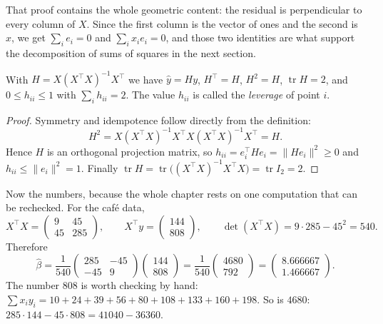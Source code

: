 That proof contains the whole geometric content: the residual is perpendicular to every column
of $X$. Since the first column is the vector of ones and the second is $x$, we get
$\sum_i e_i=0$ and $\sum_i x_ie_i=0$, and those two identities are what support the
decomposition of sums of squares in the next section.

\begin{proposisi}
With $H=X(X^{\top}X)^{-1}X^{\top}$ we have $\hat y=Hy$, $H^{\top}=H$, $H^2=H$,
$\operatorname{tr}H=2$, and $0\le h_{ii}\le1$ with $\sum_i h_{ii}=2$. The value $h_{ii}$ is
called the \emph{leverage} of point $i$.
\end{proposisi}

\begin{proof}[Proof]
Symmetry and idempotence follow directly from the definition:
\[
H^2=X(X^{\top}X)^{-1}X^{\top}X(X^{\top}X)^{-1}X^{\top}=H .
\]
Hence $H$ is an orthogonal projection matrix, so
$h_{ii}=e_i^{\top}He_i=\|He_i\|^2\ge0$ and $h_{ii}\le\|e_i\|^2=1$. Finally
$\operatorname{tr}H=\operatorname{tr}\bigl((X^{\top}X)^{-1}X^{\top}X\bigr)
=\operatorname{tr}I_2=2$.
\end{proof}

Now the numbers, because the whole chapter rests on one computation that can be rechecked. For
the café data,
\[
X^{\top}X=\begin{pmatrix}9&45\\45&285\end{pmatrix},
\qquad X^{\top}y=\begin{pmatrix}144\\808\end{pmatrix},
\qquad \det(X^{\top}X)=9\cdot285-45^2=540 .
\]
Therefore
\[
\hat\beta=\frac1{540}\begin{pmatrix}285&-45\\-45&9\end{pmatrix}
\begin{pmatrix}144\\808\end{pmatrix}
=\frac1{540}\begin{pmatrix}4680\\792\end{pmatrix}
=\begin{pmatrix}8.666667\\1.466667\end{pmatrix}.
\]
The number $808$ is worth checking by hand: $\sum x_iy_i=10+24+39+56+80+108+133+160+198$. So is
$4680$: $285\cdot144-45\cdot808=41040-36360$.

